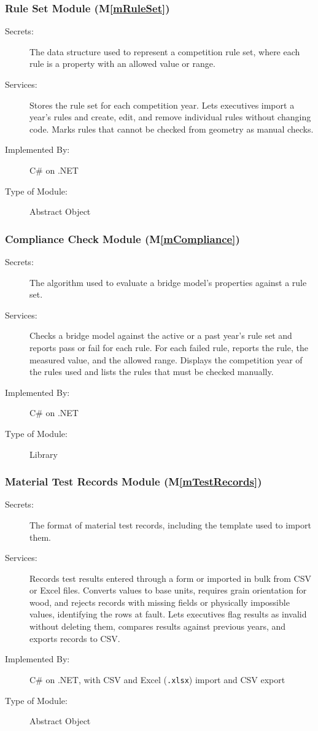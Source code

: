 \documentclass[12pt, titlepage]{article}
\begin{document}
\subsubsection{Rule Set Module (M\ref*{mRuleSet})}\label{mRuleSet:dec}

\begin{description}
\item[Secrets:] The data structure used to represent a competition rule set,
  where each rule is a property with an allowed value or range.
\item[Services:] Stores the rule set for each competition year. Lets executives
  import a year's rules and create, edit, and remove individual rules without
  changing code. Marks rules that cannot be checked from geometry as manual
  checks.
\item[Implemented By:] C\# on .NET
\item[Type of Module:] Abstract Object
\end{description}

\subsubsection{Compliance Check Module (M\ref*{mCompliance})}\label{mCompliance:dec}

\begin{description}
\item[Secrets:] The algorithm used to evaluate a bridge model's properties
  against a rule set.
\item[Services:] Checks a bridge model against the active or a past year's rule
  set and reports pass or fail for each rule. For each failed rule, reports the
  rule, the measured value, and the allowed range. Displays the competition year
  of the rules used and lists the rules that must be checked manually.
\item[Implemented By:] C\# on .NET
\item[Type of Module:] Library
\end{description}

\subsubsection{Material Test Records Module (M\ref*{mTestRecords})}\label{mTestRecords:dec}

\begin{description}
\item[Secrets:] The format of material test records, including the template used to import them.
\item[Services:] Records test results entered through a form or imported in bulk
  from CSV or Excel files. Converts values to base units, requires grain
  orientation for wood, and rejects records with missing fields or physically
  impossible values, identifying the rows at fault. Lets executives flag results
  as invalid without deleting them, compares results against previous years,
  and exports records to CSV.
\item[Implemented By:] C\# on .NET, with CSV and Excel (\texttt{.xlsx}) import and CSV export
\item[Type of Module:] Abstract Object
\end{description}
\end{document}
